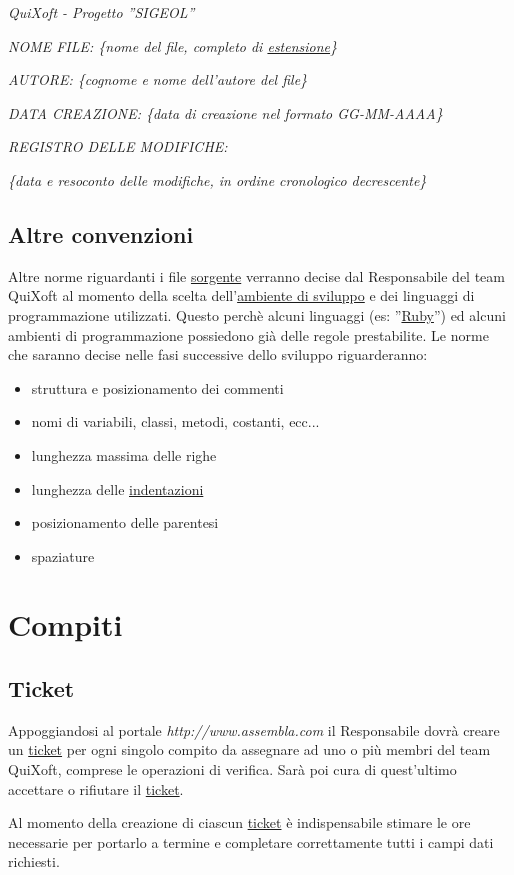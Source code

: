\documentclass[11pt,a4paper]{article}
\begin{document}
\textit{QuiXoft - Progetto ''SIGEOL''}

\textit{NOME FILE: \{nome del file, completo di \underline{estensione}\}}

\textit{AUTORE: \{cognome e nome dell'autore del file\}}

\textit{DATA CREAZIONE: \{data di creazione nel formato GG-MM-AAAA\}}

\textit{REGISTRO DELLE MODIFICHE:}

\textit{\{data e resoconto delle modifiche, in ordine cronologico decrescente\}}
\subsection{Altre convenzioni}
Altre norme riguardanti i file \underline{sorgente} verranno decise dal Responsabile del team QuiXoft al momento della scelta dell'\underline{ambiente di sviluppo} e dei linguaggi di programmazione utilizzati. Questo perchè alcuni linguaggi (es: ''\underline{Ruby}'') ed alcuni ambienti di programmazione possiedono già delle regole prestabilite. Le norme che saranno decise nelle fasi successive dello sviluppo riguarderanno:
\begin{itemize}
	\item struttura e posizionamento dei commenti
	\item nomi di variabili, classi, metodi, costanti, ecc...
	\item lunghezza massima delle righe
	\item lunghezza delle \underline{indentazioni}
	\item posizionamento delle parentesi
	\item spaziature
\end{itemize}
\section{Compiti}
\subsection{Ticket}
Appoggiandosi al portale \textit{http://www.assembla.com} il Responsabile dovrà creare un \underline{ticket} per ogni singolo compito da assegnare ad uno o più membri del team QuiXoft, comprese le operazioni di verifica.
Sarà poi cura di quest'ultimo accettare o rifiutare il \underline{ticket}.

Al momento della creazione di ciascun \underline{ticket} è indispensabile stimare le ore necessarie per portarlo a termine e completare correttamente tutti i campi dati richiesti.
\end{document}
